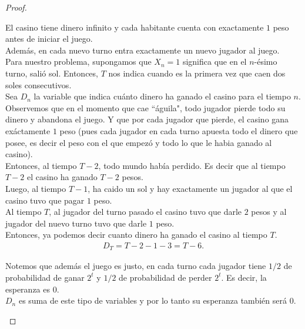 \begin{proof}
\begin{enumerate}
		   	\;El casino tiene dinero infinito y cada habitante cuenta con exactamente $1$ peso antes de
		   	iniciar el juego.\\
		   
		   	Además, en cada nuevo turno entra exactamente un nuevo jugador al juego.\\
		   
		   	Para nuestro problema, supongamos que $X_n = 1$ significa que en el $n$-ésimo turno, salió sol.
		   	Entonces, $T$ nos indica cuando es la primera vez que caen dos soles consecutivos.\\
		   
		   	Sea $D_n$ la variable que indica cuánto dinero ha ganado el casino para el tiempo $n$.\\
		   
		   	Observemos que en el momento que cae ``águila", todo jugador pierde todo su dinero y abandona el juego.
		   	Y que por cada jugador que pierde, el casino gana exáctamente $1$ peso (pues cada jugador en cada
		   	turno apuesta todo el dinero que posee, es decir el peso con el que empezó y todo lo que le habia
		   	ganado al casino).\\
		   
		   	Entonces, al tiempo $T-2$, todo mundo había perdido. Es decir que al tiempo $T-2$ el casino ha ganado
		   	$T-2$ pesos.\\
		   
		   	Luego, al tiempo $T-1$, ha caido un sol y hay exactamente un jugador al que el casino tuvo 
		   	que pagar $1$ peso.\\
		   
		   	Al tiempo $T$, al jugador del turno pasado el casino tuvo que darle $2$ pesos y al jugador del nuevo
		   	turno tuvo que darle $1$ peso.\\
		   
		   	Entonces, ya podemos decir cuanto dinero ha ganado el casino al tiempo $T$.
			\begin{align}\label{problema1_3:Dinero_al_tiempo_T}
				D_T = T-2 - 1 - 3 = T - 6. 
			\end{align}					   
		   
		   	Notemos que además el juego es justo, en cada turno cada jugador tiene $1/2$ de probabilidad de
		   	ganar $2^t$ y $1/2$ de probabilidad de perder $2^t$. Es decir, la esperanza es $0$.\\
		   	
		   	$D_n$ es suma de este tipo de variables y por lo tanto su esperanza también será $0$.\\
		   

\end{enumerate}
\end{proof}
